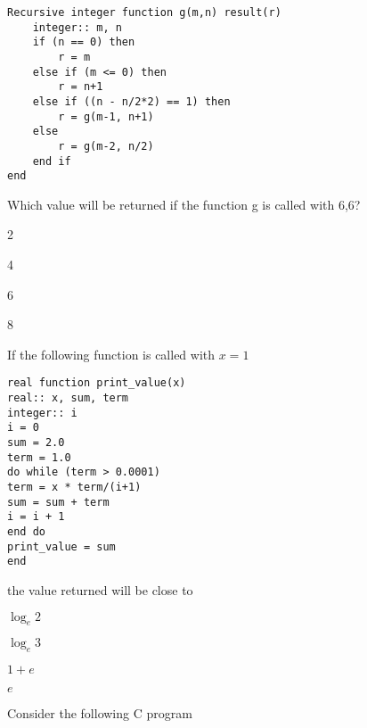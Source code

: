 \begin{lstlisting}
Recursive integer function g(m,n) result(r)
    integer:: m, n
    if (n == 0) then
        r = m
    else if (m <= 0) then
        r = n+1
    else if ((n - n/2*2) == 1) then
        r = g(m-1, n+1)
    else
        r = g(m-2, n/2)
    end if
end
\end{lstlisting}
Which value will be returned if the function g is called with 6,6?
\begin{enumerate}
    \begin{multicols}{4}
        \item 2
        \item 4
        \item 6
        \item 8
    \end{multicols}
\end{enumerate}
\bigskip
\item If the following function is called with $x=1$
\lstset{language=[90]Fortran,
        basicstyle=\ttfamily,  %
        keywordstyle=\ttfamily,  %
        commentstyle=\ttfamily,  %
        numberstyle=\tiny,
        stepnumber=1,
        numbersep=5pt,
        showstringspaces=false,
        tabsize=4,
        breaklines=true,
        frame=none}  %
\begin{lstlisting}
real function print_value(x)
real:: x, sum, term
integer:: i
i = 0
sum = 2.0
term = 1.0
do while (term > 0.0001)
term = x * term/(i+1)
sum = sum + term
i = i + 1
end do
print_value = sum
end
\end{lstlisting}
the value returned will be close to
\begin{enumerate}
    \begin{multicols}{4}
        \item $\log_e{2}$
        \item $\log_e{3}$
        \item $1+e$
        \item $e$
    \end{multicols}
\end{enumerate}
\bigskip
\item Consider the following C program
\lstset{language=[90]Fortran,
        basicstyle=\ttfamily,  %
        keywordstyle=\ttfamily,  %
        commentstyle=\ttfamily,  %
        numberstyle=\tiny,
        stepnumber=1,
        numbersep=5pt,
        showstringspaces=false,
        tabsize=4,
        breaklines=true,
        frame=none}  %
